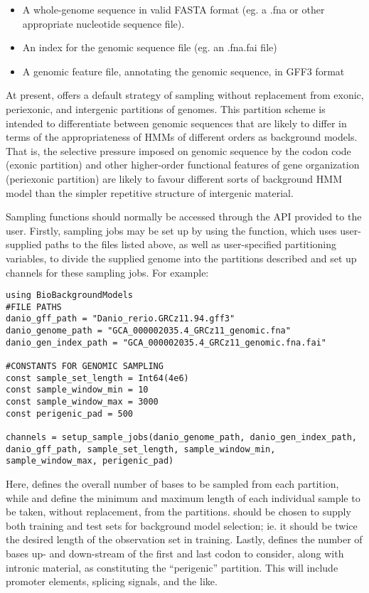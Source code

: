 \begin{itemize}
    \item A whole-genome sequence in valid FASTA format (eg. a .fna or other appropriate nucleotide sequence file).
    \item An index for the genomic sequence file (eg. an .fna.fai file)
    \item A genomic feature file, annotating the genomic sequence, in GFF3 format
\end{itemize}

At present,  offers a default strategy of sampling without replacement from exonic, periexonic, and intergenic partitions of genomes. This partition scheme is intended to differentiate between genomic sequences that are likely to differ in terms of the appropriateness of HMMs of different orders as background models. That is, the selective pressure imposed on genomic sequence by the codon code (exonic partition) and other higher-order functional features of gene organization (periexonic partition) are likely to favour different sorts of background HMM model than the simpler repetitive structure of intergenic material.

Sampling functions should normally be accessed through the API provided to the user. Firstly, sampling jobs may be set up by using the  function, which uses user-supplied paths to the files listed above, as well as user-specified partitioning variables, to divide the supplied genome into the partitions described and set up channels for these sampling jobs. For example:

\begin{verbatim}
using BioBackgroundModels
#FILE PATHS
danio_gff_path = "Danio_rerio.GRCz11.94.gff3"
danio_genome_path = "GCA_000002035.4_GRCz11_genomic.fna"
danio_gen_index_path = "GCA_000002035.4_GRCz11_genomic.fna.fai"

#CONSTANTS FOR GENOMIC SAMPLING
const sample_set_length = Int64(4e6)
const sample_window_min = 10
const sample_window_max = 3000
const perigenic_pad = 500

channels = setup_sample_jobs(danio_genome_path, danio_gen_index_path, danio_gff_path, sample_set_length, sample_window_min, sample_window_max, perigenic_pad)
\end{verbatim}

Here,  defines the overall number of bases to be sampled from each partition, while  and  define the minimum and maximum length of each individual sample to be taken, without replacement, from the partitions.  should be chosen to supply both training and test sets for background model selection; ie. it should be twice the desired length of the observation set in training. Lastly,  defines the number of bases up- and down-stream of the first and last codon to consider, along with intronic material, as constituting the ``perigenic'' partition. This will include promoter elements, splicing signals, and the like.

